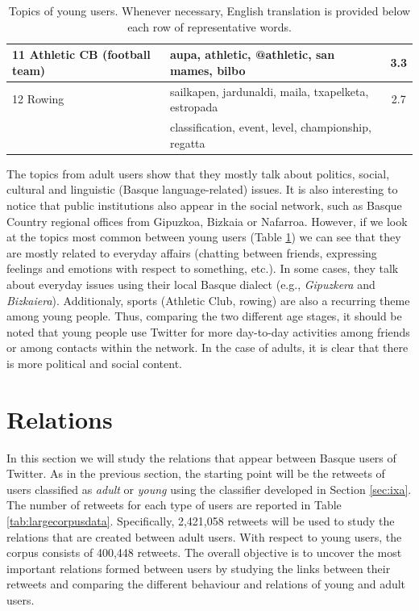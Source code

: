 \documentclass[information,article,submit,moreauthors,pdftex,10pt,a4paper]{Definitions/mdpi}
\begin{document}
\begin{table}[H]
\begin{tabular}{llc}
                   11 Athletic CB (football team) & aupa, athletic, @athletic, san mames, bilbo  & 3.3 \\ \hline
                   12 Rowing & sailkapen, jardunaldi, maila, txapelketa, estropada & 2.7 \\
                   & classification, event, level, championship, regatta & \\ \hline
  \end{tabular}
  \caption{Topics of young users. Whenever necessary, English translation is provided below each row of representative words.}
  \label{tab:young-tp}
\end{table}

The topics from adult users show that they mostly talk about politics, social, cultural and linguistic (Basque language-related) issues. It is also interesting to notice that public institutions also appear in the social network, such as Basque Country regional offices from Gipuzkoa, Bizkaia or Nafarroa. However, if we look at the topics most common between young users (Table \ref{tab:young-tp}) we can see that they are mostly related to everyday affairs (chatting between friends, expressing feelings and emotions with respect to something, etc.). In some cases, they talk about everyday issues using their local Basque dialect (e.g., \emph{Gipuzkera} and \emph{Bizkaiera}). Additionaly, sports (Athletic Club, rowing) are also a recurring theme among young people. Thus, comparing the two different age stages, it should be noted that young people use Twitter for more day-to-day activities among friends or among contacts within the network. In the case of adults, it is clear that there is more political and social content.



\section{Relations}\label{sec:connections}

In this section we will study the relations that appear between Basque users of Twitter. As in the previous section, the starting point will be the retweets of users classified as \emph{adult} or \emph{young} using the classifier developed in Section \ref{sec:ixa}. The number of retweets for each type of users are reported in Table \ref{tab:largecorpusdata}. Specifically, 2,421,058 retweets will be used to study the relations that are created between adult users. With respect to young users, the corpus consists of 400,448 retweets. The overall objective is to uncover the most important relations formed between users by studying the links between their retweets and comparing the different behaviour and relations of young and adult users.
\end{document}
